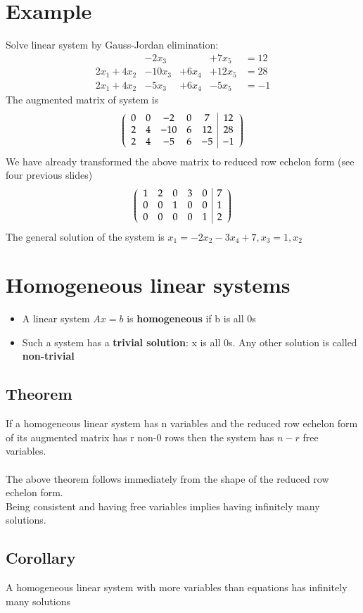 \documentclass{article}[18pt]
\begin{document}
\section{Example}
Solve linear system by Gauss-Jordan elimination:
$$\begin{aligned} &- 2 x _ { 3 } & &+ 7 x _ { 5 } & = 12 \\ 2 x _ { 1 } + 4 x _ { 2 } & - 10 x _ { 3 } & + 6 x _ { 4 } & + 12 x _ { 5 } & = 28 \\ 2 x _ { 1 } + 4 x _ { 2 } & - 5 x _ { 3 } & + 6 x _ { 4 } & - 5 x _ { 5 } & = - 1 \end{aligned}$$
The augmented matrix of system is
$$\left( \begin{array} { c c c c c | c } { 0 } & { 0 } & { - 2 } & { 0 } & { 7 } & { 12 } \\ { 2 } & { 4 } & { - 10 } & { 6 } & { 12 } & { 28 } \\ { 2 } & { 4 } & { - 5 } & { 6 } & { - 5 } & { - 1 } \end{array} \right)$$
We have already transformed the above matrix to reduced row echelon form (see four previous slides)
$$\left( \begin{array} { c c c c c | c } { 1 } & { 2 } & { 0 } & { 3 } & { 0 } & { 7 } \\ { 0 } & { 0 } & { 1 } & { 0 } & { 0 } & { 1 } \\ { 0 } & { 0 } & { 0 } & { 0 } & { 1 } & { 2 } \end{array} \right)$$
The general solution of the system is $x_1=-2x_2-3x_4+7, x_3=1, x_2$
\section{Homogeneous linear systems}
\begin{itemize}
\item A linear system $Ax=b$ is \textbf{homogeneous} if b is all 0s
\item Such a system has a \textbf{trivial solution}: x is all 0s. Any other solution is called \textbf{non-trivial}
\end{itemize}
\subsection{Theorem}
If a homogeneous linear system has n variables and the reduced row echelon form of its augmented matrix has r non-0 rows then the system has $n-r$ free variables.\\
\\
The above theorem follows immediately from the shape of the reduced row echelon form.\\
Being consistent and having free variables implies having infinitely many solutions.
\subsection{Corollary}
A homogeneous linear system with more variables than equations has infinitely many solutions
\end{document}
